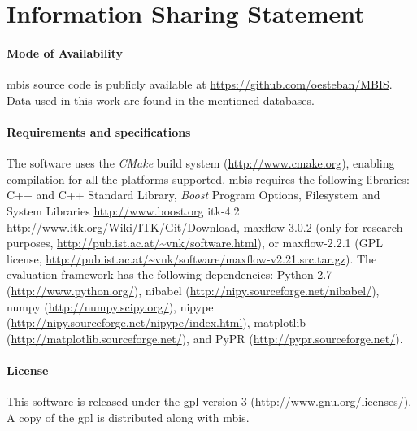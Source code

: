 \section*{Information Sharing Statement}
\label{sec:iss}
\paragraph{Mode of Availability}
\gls*{mbis} source code is publicly available at \url{https://github.com/oesteban/MBIS}.
Data used in this work are found in the mentioned databases.
\paragraph{Requirements and specifications}
The software uses the \emph{CMake} build system (\url{http://www.cmake.org}),
  enabling compilation for all the platforms supported.
\Gls*{mbis} requires the following libraries:
  C++ and C++ Standard Library,
  \emph{Boost} Program Options, Filesystem and System Libraries \url{http://www.boost.org}
  \gls*{itk}-4.2  \url{http://www.itk.org/Wiki/ITK/Git/Download},
  maxflow-3.0.2 (only for research purposes, \url{http://pub.ist.ac.at/~vnk/software.html}), or
  maxflow-2.2.1 (GPL license, \url{http://pub.ist.ac.at/~vnk/software/maxflow-v2.21.src.tar.gz}).
The evaluation framework has the following dependencies:
  Python 2.7 (\url{http://www.python.org/}),
  nibabel (\url{http://nipy.sourceforge.net/nibabel/}),
  numpy (\url{http://numpy.scipy.org/}),
  \gls*{nipype} (\url{http://nipy.sourceforge.net/nipype/index.html}),
  matplotlib (\url{http://matplotlib.sourceforge.net/}), and
  PyPR (\url{http://pypr.sourceforge.net/}).
  
\paragraph{License}
This software is released under the \gls*{gpl} version 3  (\url{http://www.gnu.org/licenses/}). A copy of the \gls*{gpl} is distributed along with \gls*{mbis}.
